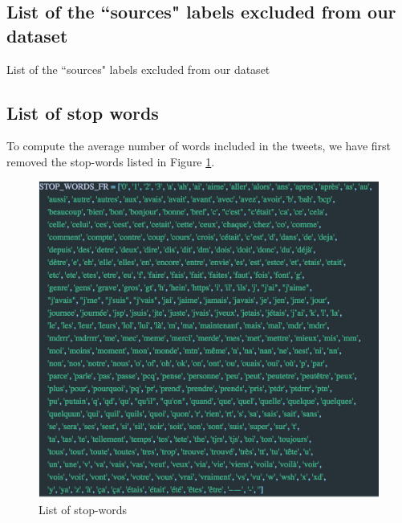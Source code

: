 \subsection{List of the ``sources" labels excluded from our dataset} \label{Appendix:Bots}
\begin{table}[H]
    \centering
    \resizebox*{!}{\dimexpr\textheight-1\baselineskip\relax}{
    
    }
    \caption{List of the ``sources" labels excluded from our dataset}
    \label{tab:botlist}
\end{table}


\subsection{List of stop words}
\label{Appendix:StopWords}
To compute the average number of words included in the tweets, we have first removed the stop-words listed in Figure \ref{fig:stop_words}.

\begin{figure}
\begin{center}
\includegraphics[scale=.7]{figures/stop_words.png}
\end{center}
\vspace{.5cm}	
	\caption{List of stop-words}
	\label{fig:stop_words}
\end{figure}


